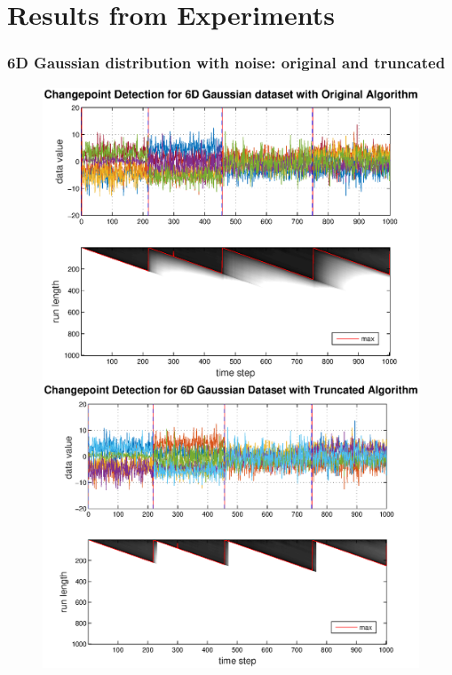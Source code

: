 \documentclass{beamer} %
\begin{document}
\section{Results from Experiments}


\begin{frame}
\frametitle{6D Gaussian distribution with noise: original and truncated}
\begin{figure}
\centering
\begin{minipage}{.5\textwidth}
  \centering
  \includegraphics[width=\linewidth]{6d_gauss_full.eps}
\end{minipage}%
\begin{minipage}{.5\textwidth}
  \centering
  \includegraphics[width=\textwidth]{6d_gauss_fast.eps}
\end{minipage}
\end{figure}
\end{frame}
\end{document}
